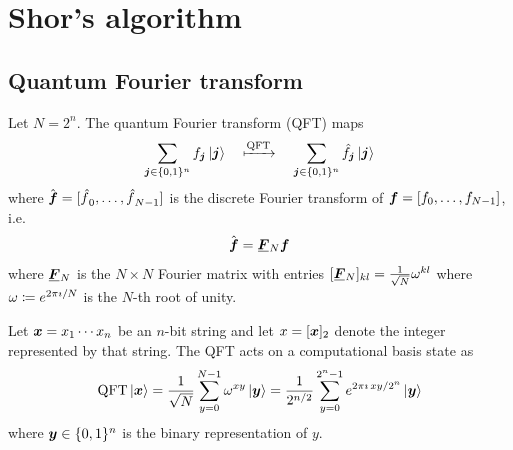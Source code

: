 \clearpage
\section{Shor's algorithm}\label{sec:shor}

\subsection{Quantum Fourier transform}\label{sec:quantum-fourier-transform}
Let $N = 2^n$.
The quantum Fourier transform (QFT) %
maps
\[
\sum_{{\boldsymbol{j}}\in\{0,1\}^n} f_{\boldsymbol{j}}\ket{{\boldsymbol{j}}}
\quad
\xmapsto{\operatorname{QFT}}
\quad
\sum_{{\boldsymbol{j}}\in\{0,1\}^n} \hat{f}_{\boldsymbol{j}}\ket{{\boldsymbol{j}}}
\]
where
$\hat{{\boldsymbol{f}}} = [{\hat{f}}_0, \ldots, {\hat{f}}_{N-1}]$ is the discrete Fourier transform of ${\boldsymbol{f}} = [f_0, \ldots, f_{N-1}]$,
i.e.
\[
  \hat{\vect{f}} = \matr{F}_N \vect{f}
\]
where $\matr{F}_N$ is the $N\times N$ Fourier matrix with entries
\(
[\matr{F}_N]_{k l}
=
\frac{1}{\sqrt N}\omega^{kl}
\)
where $\omega \coloneq e^{2\pi\imath/N}$ is the $N$-th root of unity.

Let
\(
{\boldsymbol{x}}=x_1\cdots x_n
\)
be an \(n\)-bit string and let
\(
x=[{\boldsymbol{x}}]_2
\)
denote the integer represented by that string.
The QFT acts on a computational basis state as
\begin{equation}\label{eq:qft-computational-basis}
\operatorname{QFT}\ket{{\boldsymbol{x}}}
=
\frac{1}{\sqrt N}
\sum_{y = 0}^{N-1}
\omega^{xy}
\ket{{\boldsymbol{y}}}
=
\frac{1}{2^{n/2}}
\sum_{y=0}^{2^n-1}
e^{2\pi\imath\,xy/2^n}
\ket{{\boldsymbol{y}}}
\end{equation}
where \({\boldsymbol{y}}\in\{0,1\}^n\) is the binary representation of \(y\).





